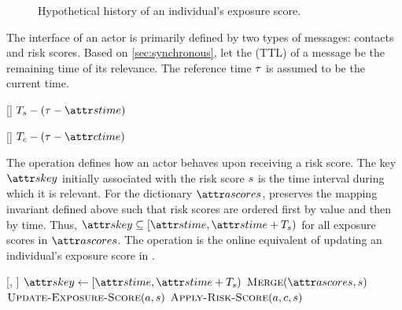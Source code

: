 \begin{figure}[htb]
\centering
{}
\caption[Historical exposure scores of an actor]{Hypothetical history of an individual's exposure score.}
\label{fig:exposure}
\end{figure}


The interface of an actor is primarily defined by two types of messages: contacts and risk scores. Based on \cref{sec:synchronous}, let the  (TTL) of a message be the remaining time of its relevance. The reference time $\tau$ is assumed to be the current time.

\begin{function}{\nRiskScoreTtl}[\vScore]
  \State \Return $\pScoreExpiry - (\vReferenceTime - \aScoreTime)$
\end{function}

\begin{function}{\nContactTtl}[\vContact]
  \State \Return $\pContactExpiry - (\vReferenceTime - \aContactTime)$
\end{function}

The \cHandleRiskScore operation defines how an actor behaves upon receiving a risk score. The key $\aScoreKey$ initially associated with the risk score $s$ is the time interval during which it is relevant. For the dictionary $\aActorScores$, \cMerge preserves the mapping invariant defined above such that risk scores are ordered first by value and then by time. Thus, $\aScoreKey \subseteq [\aScoreTime, \aScoreTime + \pScoreExpiry)$ for all exposure scores in $\aActorScores$. The \cUpdateExposureScore operation is the online equivalent of updating an individual's exposure score in \cRiskPropagation.

\begin{function}[H]{\nHandleRiskScore}[\vActor, \vScore]
    \State $\aScoreKey \assign [\aScoreTime, \aScoreTime + \pScoreExpiry)$
    \State $\cMerge[\aActorScores, \vScore]$
    \State $\cUpdateExposureScore[\vActor, \vScore]$
    \ForEach{$\vContact \in \aActorContacts$}
      \State $\cApplyRiskScore[\vActor, \vContact, \vScore]$
    \EndFor
  \EndIf
\end{function}

